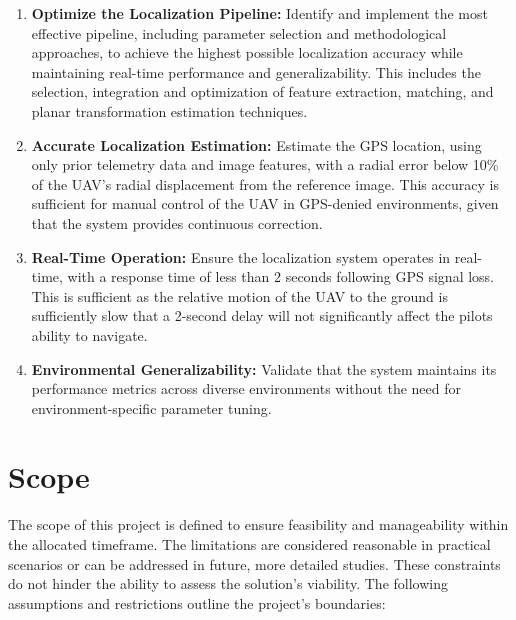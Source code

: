 \begin{enumerate}
    \item \textbf{Optimize the Localization Pipeline:} Identify and implement the most effective pipeline, including parameter selection and methodological approaches, to achieve the highest possible localization accuracy while maintaining real-time performance and generalizability. This includes the selection, integration and optimization of feature extraction, matching, and planar transformation estimation techniques.
    \item \textbf{Accurate Localization Estimation:} Estimate the GPS location, using only prior telemetry data and image features, with a radial error below 10\% of the UAV's radial displacement from the reference image. This accuracy is sufficient for manual control of the UAV in GPS-denied environments, given that the system provides continuous correction.
    \item \textbf{Real-Time Operation:} Ensure the localization system operates in real-time, with a response time of less than 2 seconds following GPS signal loss. This is sufficient as the relative motion of the UAV to the ground is sufficiently slow that a 2-second delay will not significantly affect the pilots ability to navigate.
    \item \textbf{Environmental Generalizability:} Validate that the system maintains its performance metrics across diverse environments without the need for environment-specific parameter tuning.
\end{enumerate}


\section{Scope}
\label{sec:scope}
The scope of this project is defined to ensure feasibility and manageability within the allocated timeframe. The limitations are considered reasonable in practical scenarios or can be addressed in future, more detailed studies. These constraints do not hinder the ability to assess the solution's viability. The following assumptions and restrictions outline the project's boundaries:

